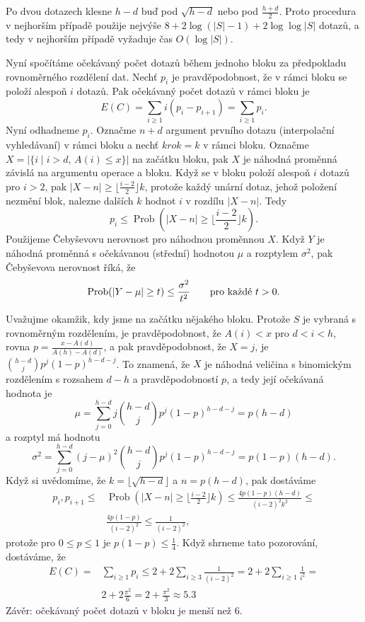 \documentclass[a4paper,12pt]{article}
\DeclareMathOperator*{\Prob}{Prob}
\begin{document}
Po dvou dotazech klesne $h-d$ buď pod $\sqrt {h-d}$ nebo pod 
$\frac {h+d}2$. Proto procedura v nejhorším případě použije 
nejvýše $8+2\log(|S|-1)+2\log\log|S|$ dotazů, a tedy v nejhorším 
případě vyžaduje čas $O(\log|S|)$.

Nyní spočítáme očekávaný počet dotazů 
během jednoho bloku za předpokladu rovnoměr\-ného rozdělení dat. Nechť $p_i$ je prav\-dě\-podobnost, že 
v rámci bloku se položí ales\-poň $i$ dotazů. Pak 
očekávaný počet dotazů v rámci bloku je 
$$E(C)=\sum_{i\ge 1}i(p_i-p_{i+1})=\sum_{i\ge 1}p_i.$$
Nyní odhadneme $p_i$.  Označme $n+d$ argument prvního dotazu 
(interpolační vyhledávaní) v rámci bloku a nechť $
krok=k$ 
v rámci bloku.  Označme $X=|\{i\mid i>d,\,A(i)\le x\}|$ na 
začátku bloku, pak $X$ je náhodná proměnná závislá na 
argumentu ope\-race a bloku.  Když se v bloku položí 
alespoň $i$ dotazů pro $i>2$, pak $|X-n|\ge\lfloor\frac {
i-2}2\rfloor k$, 
protože každý unární dotaz, jehož položení  
nezmění blok, nalezne dalších $k$ hodnot $i$ v rozdílu $|X-n|$. 
Tedy 
$$p_i\le\Prob(|X-n|\ge\lfloor\frac {i-2}2\rfloor k).$$
Použijeme Čebyševovu nerovnost pro náhodnou 
proměn\-nou $X$. Když $Y$ je náhodná proměnná s očekávanou 
(střední) hodnotou $\mu$ a rozptylem $\sigma^2$, pak Čebyševova 
nerovnost říká, že 
$$\Prob(|Y-\mu |\ge t)\le\frac {\sigma^2}{t^2}\qquad\text{\rm pro každé }
t>0.$$

Uvažujme okamžik, kdy jsme na začátku nějakého 
bloku. Pro\-tože $S$ je vybraná s rovno\-měr\-ným rozdělením, je 
pravděpodob\-nost, že $A(i)<x$ pro $d<i<h$, rovna 
$p=\frac {x-A(d)}{A(h)-A(d)}$, a pak pravděpodobnost, že 
$X=j$, je $\binom {h-d}jp^j(1-p)^{h-d-j}$. To znamená, že $X$ je náhodná 
veličina s binomickým rozdělením s rozsahem $d-h$ a pravděpodobností $p$, a tedy její očekávaná 
hodnota je
$$\mu =\sum_{j=0}^{h-d}j\binom {h-d}jp^j(1-p)^{h-d-j}=p(h-d)$$
a rozptyl má hodnotu 
$$\sigma^2=\sum_{j=0}^{h-d}(j-\mu )^2\binom {h-d}jp^j(1-p)^{h-d-j}
=p(1-p)(h-d).$$
Když si uvědomíme, že $k=\lfloor\sqrt {h-d}\rfloor$ a $
n=p(h-d)$, pak dostáváme
\begin{align*} p_i,p_{i+1}\le&\Prob(|X-n|\ge\lfloor\frac {i-2}2\rfloor k 
)\le\frac {4p(1-p)(h-d)}{(i-2)^2k^2}\le\\
&\frac {4p(1-p)}{(i-2)^2}\le\frac 1{(i-2)^2},\end{align*}
protože pro $0\le p\le 1$ je $p(1-p)\le\frac 14$. Když shrneme tato pozorování, 
dostává\-me, že 
\begin{align*} E(C)=&\sum_{i\ge 1}p_i\le 2+2\sum_{i\ge 3}\frac 1{(i-2)^2}=
2+2\sum_{i\ge 1}\frac 1{i^2}=\\
&2+2\frac {\pi^2}6=2+\frac {\pi^2}3\approx 5.3\end{align*}
Závěr: očekávaný počet dotazů v bloku je menší než $
6$.
\end{document}

